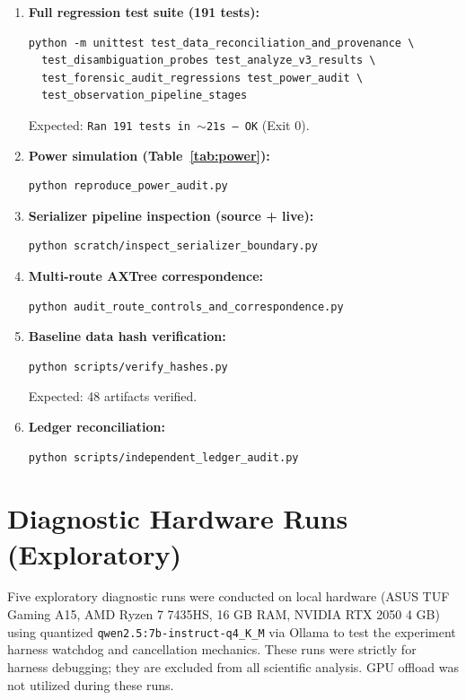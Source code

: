 \documentclass[conference]{IEEEtran}
\begin{document}
\begin{enumerate}
    \item \textbf{Full regression test suite (191 tests):}
\begin{lstlisting}
python -m unittest test_data_reconciliation_and_provenance \
  test_disambiguation_probes test_analyze_v3_results \
  test_forensic_audit_regressions test_power_audit \
  test_observation_pipeline_stages
\end{lstlisting}
Expected: \texttt{Ran 191 tests in $\sim$21s --- OK} (Exit 0).

    \item \textbf{Power simulation (Table~\ref{tab:power}):}
\begin{lstlisting}
python reproduce_power_audit.py
\end{lstlisting}

    \item \textbf{Serializer pipeline inspection (source + live):}
\begin{lstlisting}
python scratch/inspect_serializer_boundary.py
\end{lstlisting}

    \item \textbf{Multi-route AXTree correspondence:}
\begin{lstlisting}
python audit_route_controls_and_correspondence.py
\end{lstlisting}

    \item \textbf{Baseline data hash verification:}
\begin{lstlisting}
python scripts/verify_hashes.py
\end{lstlisting}
Expected: 48 artifacts verified.

    \item \textbf{Ledger reconciliation:}
\begin{lstlisting}
python scripts/independent_ledger_audit.py
\end{lstlisting}
\end{enumerate}

\FloatBarrier

\section{Diagnostic Hardware Runs (Exploratory)}
\label{app:local_diagnostics}

Five exploratory diagnostic runs were conducted on local hardware (ASUS TUF Gaming A15, AMD Ryzen 7 7435HS, 16 GB RAM, NVIDIA RTX 2050 4 GB) using quantized \texttt{qwen2.5:7b-instruct-q4\_K\_M} via Ollama to test the experiment harness watchdog and cancellation mechanics. These runs were strictly for harness debugging; they are excluded from all scientific analysis. GPU offload was not utilized during these runs.
\end{document}
